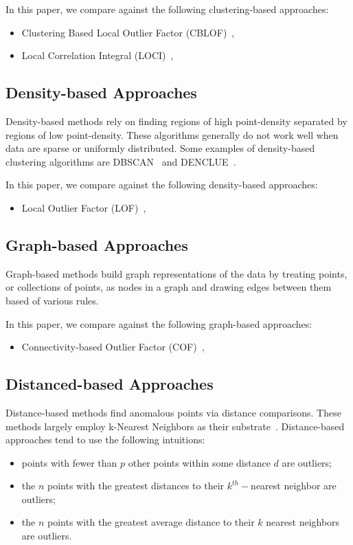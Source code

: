 In this paper, we compare against the following clustering-based approaches:
\begin{itemize}
    \item Clustering Based Local Outlier Factor (CBLOF)~\cite{he2003cblof},
    \item Local Correlation Integral (LOCI)~\cite{papadimitriou2003loci},
\end{itemize}


\subsection{Density-based Approaches}
\label{subsec:introduction:density-based-approaches}

Density-based methods rely on finding regions of high point-density separated by regions of low point-density.
These algorithms generally do not work well when data are sparse or uniformly distributed.
Some examples of density-based clustering algorithms are
DBSCAN~\cite{ester1996density} and
DENCLUE~\cite{hinneburg1998efficient}.

In this paper, we compare against the following density-based approaches:
\begin{itemize}
    \item Local Outlier Factor (LOF)~\cite{breunig2000lof},
\end{itemize}


\subsection{Graph-based Approaches}
\label{subsec:introduction:graph-based-approaches}

Graph-based methods build graph representations of the data by treating points, or collections of points, as nodes in a graph and drawing edges between them based of various rules.

In this paper, we compare against the following graph-based approaches:
\begin{itemize}
    \item Connectivity-based Outlier Factor (COF)~\cite{tang2002cof},
\end{itemize}


\subsection{Distanced-based Approaches}
\label{subsec:related-works:distanced-based-approaches}

Distance-based methods find anomalous points via distance comparisons.
These methods largely employ k-Nearest Neighbors as their substrate~\cite{wang2019progress}.
Distance-based approaches tend to use the following intuitions:
\begin{itemize}
    \item points with fewer than $p$ other points within some distance $d$ are outliers;
    \item the $n$ points with the greatest distances to their $k^{th}-$nearest neighbor are outliers;
    \item the $n$ points with the greatest average distance to their $k$ nearest neighbors are outliers.
\end{itemize}

